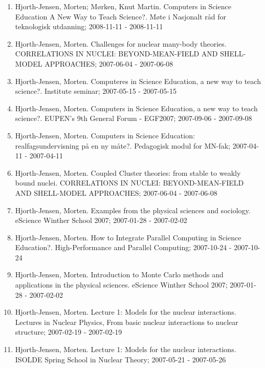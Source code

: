 \documentclass[a4wide,10pt]{article}
\begin{document}
\begin{enumerate}
\item Hjorth-Jensen, Morten; Mørken, Knut Martin.  Computers in Science Education A New Way to Teach Science?. Møte i Nasjonalt råd for teknologisk utdanning; 2008-11-11 - 2008-11-11

\item Hjorth-Jensen, Morten.  Challenges for nuclear many-body theories. CORRELATIONS IN NUCLEI: BEYOND-MEAN-FIELD AND SHELL-MODEL APPROACHES; 2007-06-04 - 2007-06-08

\item Hjorth-Jensen, Morten.  Computeres in Science Education, a new way to teach science?. Institute seminar; 2007-05-15 - 2007-05-15

\item Hjorth-Jensen, Morten.  Computers in Science Education, a new way to teach science?. EUPEN's 9th General Forum - EGF2007; 2007-09-06 - 2007-09-08

\item Hjorth-Jensen, Morten.  Computers in Science Education: realfagsundervisning på en ny måte?. Pedagogisk modul for MN-fak; 2007-04-11 - 2007-04-11

\item Hjorth-Jensen, Morten.  Coupled Cluster theories: from stable to weakly bound nuclei. CORRELATIONS IN NUCLEI: BEYOND-MEAN-FIELD AND SHELL-MODEL APPROACHES; 2007-06-04 - 2007-06-08

\item Hjorth-Jensen, Morten.  Examples from the physical sciences and sociology. eScience Winther School 2007; 2007-01-28 - 2007-02-02

\item Hjorth-Jensen, Morten.  How to Integrate Parallel Computing in Science Education?. High-Performance and Parallel Computing; 2007-10-24 - 2007-10-24

\item Hjorth-Jensen, Morten.  Introduction to Monte Carlo methods and applications in the physical sciences. eScience Winther School 2007; 2007-01-28 - 2007-02-02

\item Hjorth-Jensen, Morten.  Lecture 1: Models for the nuclear interactions. Lectures in Nuclear Physics, From basic nuclear interactions to nuclear structure; 2007-02-19 - 2007-02-19

\item Hjorth-Jensen, Morten.  Lecture 1: Models for the nuclear interactions. ISOLDE Spring School in Nuclear Theory; 2007-05-21 - 2007-05-26


\end{enumerate}
\end{document}
